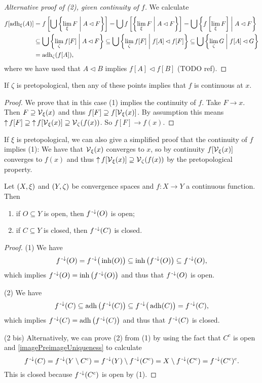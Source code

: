\begin{proof}[Alternative proof of (2), given continuity of $f$]
We calculate
\begin{align*}
f[\adh_\xi(A)] &= f\left[\bigcup \setbuilder{\lim_\xi F}{A \lhd F} \right] = \bigcup f\left[ \setbuilder{\lim_\xi F}{A \lhd F} \right] = \bigcup \setbuilder{f\left[\lim_\xi F\right]}{A \lhd F} \\
&\subseteq \bigcup \setbuilder{\lim_\zeta f[F]}{A \lhd F} \subseteq \bigcup \setbuilder{\lim_\zeta f[F]}{f[A] \lhd f[F]} \subseteq \bigcup \setbuilder{\lim_\zeta G}{f[A] \lhd G} \\
&= \adh_\zeta(f[A]),
\end{align*}
where we have used that $A \lhd B$ implies $f[A] \lhd f[B]$ (TODO ref).
\end{proof}
\begin{corollary} \label{pretopologicalContinuityVicinities}
If $\zeta$ is pretopological, then any of these points implies that $f$ is continuous at $x$.
\end{corollary}
\begin{proof}
We prove that in this case (1) implies the continuity of $f$. Take $F\to x$. Then $F\supseteq \operatorname{\mathcal{V}}_\xi(x)$ and thus $f[F]\supseteq f[\operatorname{\mathcal{V}}_\xi(x)]$. By assumption this means $\operatorname{\uparrow} f[F]\supseteq \operatorname{\uparrow} f[\operatorname{\mathcal{V}}_\xi(x)]\supseteq \operatorname{\mathcal{V}}_\zeta(f(x))$. So $f[F]\to f(x)$.
\end{proof}

If $\xi$ is pretopological, we can also give a simplified proof that the continuity of $f$ implies (1): We have that $\operatorname{\mathcal{V}}_\xi(x)$ converges to $x$, so by continuity $f[\operatorname{\mathcal{V}}_\xi(x)]$ converges to $f(x)$ and thus $\operatorname{\uparrow} f[\operatorname{\mathcal{V}}_\xi(x)] \supseteq \operatorname{\mathcal{V}}_\zeta(f(x))$ by the pretopological property.
\begin{corollary} \label{preimageOpenClosed}
Let $\left( X,\xi \right)$ and $\left( Y,\zeta \right)$ be convergence spaces and $f: X\to Y$ a continuous function. Then
\begin{enumerate}
\item if $O\subseteq Y$ is open, then $f^{\text{\hspace{0.15em}-}\downarrow}(O)$ is open;
\item if $C\subseteq Y$ is closed, then $f^{\text{\hspace{0.15em}-}\downarrow}(C)$ is closed.
\end{enumerate}
\end{corollary}
\begin{proof}
(1) We have
\[ f^{\text{\hspace{0.15em}-}\downarrow}(O) = f^{\text{\hspace{0.15em}-}\downarrow}\big(\operatorname{inh}(O)\big) \subseteq \operatorname{inh}\big(f^{\text{\hspace{0.15em}-}\downarrow}(O)\big) \subseteq f^{\text{\hspace{0.15em}-}\downarrow}(O), \]
which implies $f^{\text{\hspace{0.15em}-}\downarrow}(O) = \operatorname{inh}\big(f^{\text{\hspace{0.15em}-}\downarrow}(O)\big)$ and thus that $f^{\text{\hspace{0.15em}-}\downarrow}(O)$ is open.

(2) We have
\[ f^{\text{\hspace{0.15em}-}\downarrow}(C) \subseteq \operatorname{adh}\big(f^{\text{\hspace{0.15em}-}\downarrow}(C)\big) \subseteq f^{\text{\hspace{0.15em}-}\downarrow}\big(\operatorname{adh}(C)\big) = f^{\text{\hspace{0.15em}-}\downarrow}(C), \]
which implies $f^{\text{\hspace{0.15em}-}\downarrow}(C) = \operatorname{adh}\big(f^{\text{\hspace{0.15em}-}\downarrow}(C)\big)$ and thus that $f^{\text{\hspace{0.15em}-}\downarrow}(C)$ is closed.

(2 bis) Alternatively, we can prove (2) from (1) by using the fact that $C^c$ is open and \ref{imagePreimageUniqueness} to calculate
\[ f^{\text{\hspace{0.15em}-}\downarrow}(C) = f^{\text{\hspace{0.15em}-}\downarrow}(Y\setminus C^c) = f^{\text{\hspace{0.15em}-}\downarrow}(Y)\setminus f^{\text{\hspace{0.15em}-}\downarrow}(C^c) = X\setminus f^{\text{\hspace{0.15em}-}\downarrow}(C^c) = f^{\text{\hspace{0.15em}-}\downarrow}(C^c)^c. \]
This is closed because $f^{\text{\hspace{0.15em}-}\downarrow}(C^c)$ is open by (1).
\end{proof}


